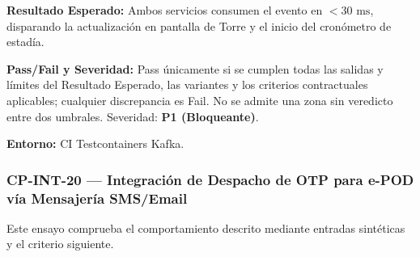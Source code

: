 \par\noindent\textbf{Resultado Esperado:} Ambos servicios consumen el evento en \(< 30\text{ ms}\), disparando la actualización en pantalla de Torre y el inicio del cronómetro de estadía.\par
\par\noindent\textbf{Pass/Fail y Severidad:} Pass únicamente si se cumplen todas las salidas y límites del Resultado Esperado, las variantes y los criterios contractuales aplicables; cualquier discrepancia es Fail. No se admite una zona sin veredicto entre dos umbrales. Severidad: \textbf{P1 (Bloqueante)}.\par
\par\noindent\textbf{Entorno:} CI Testcontainers Kafka.\par






\subsubsection*{CP-INT-20 — Integración de Despacho de OTP para e-POD vía Mensajería SMS/Email}\label{sec:9-cp-int-20}
Este ensayo comprueba el comportamiento descrito mediante entradas sintéticas y el criterio siguiente.

